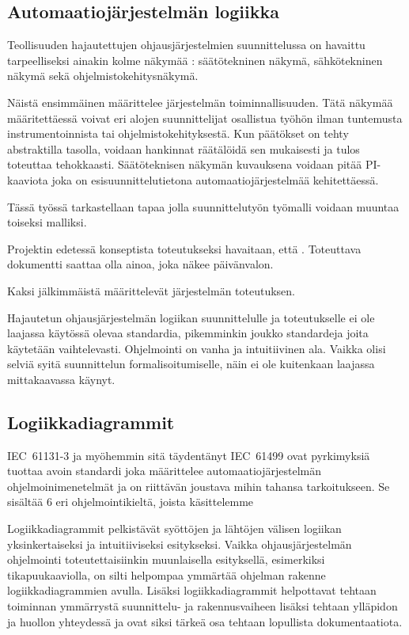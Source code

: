 \documentclass[finnish,12pt]{article}
\begin{document}
	\subsection{Automaatiojärjestelmän logiikka}

Teollisuuden hajautettujen ohjausjärjestelmien suunnittelussa on havaittu tarpeelliseksi ainakin kolme näkymää \cite{RefWorks:38}: säätötekninen näkymä, sähkötekninen näkymä sekä ohjelmistokehitysnäkymä.

Näistä ensimmäinen määrittelee järjestelmän toiminnallisuuden. Tätä näkymää määritettäessä voivat eri alojen suunnittelijat osallistua työhön ilman tuntemusta instrumentoinnista tai ohjelmistokehityksestä. Kun päätökset on tehty abstraktilla tasolla, voidaan hankinnat räätälöidä sen mukaisesti ja tulos toteuttaa tehokkaasti. Säätöteknisen näkymän kuvauksena voidaan pitää PI-kaaviota joka on esisuunnittelutietona automaatiojärjestelmää kehitettäessä.

Tässä työssä tarkastellaan tapaa jolla suunnittelutyön työmalli voidaan muuntaa toiseksi malliksi.

Projektin edetessä konseptista toteutukseksi havaitaan, että . Toteuttava dokumentti saattaa olla ainoa, joka näkee päivänvalon. 

Kaksi jälkimmäistä määrittelevät järjestelmän toteutuksen. 

Hajautetun ohjausjärjestelmän logiikan suunnittelulle ja toteutukselle ei ole laajassa käytössä olevaa standardia, pikemminkin joukko standardeja joita käytetään vaihtelevasti. Ohjelmointi on vanha ja intuitiivinen ala. Vaikka olisi selviä syitä suunnittelun formalisoitumiselle, näin ei ole kuitenkaan laajassa mittakaavassa käynyt.

	\subsection{Logiikkadiagrammit}

IEC~61131-3 ja myöhemmin sitä täydentänyt IEC~61499 ovat pyrkimyksiä tuottaa avoin standardi joka määrittelee automaatiojärjestelmän ohjelmoinimenetelmät ja on riittävän joustava mihin tahansa tarkoitukseen. Se sisältää 6 eri ohjelmointikieltä, joista käsittelemme

Logiikkadiagrammit pelkistävät syöttöjen ja lähtöjen välisen logiikan yksinkertaiseksi ja intuitiiviseksi esitykseksi. Vaikka ohjausjärjestelmän ohjelmointi toteutettaisiinkin muunlaisella esityksellä, esimerkiksi tikapuukaaviolla, on silti helpompaa ymmärtää ohjelman rakenne logiikkadiagrammien avulla. Lisäksi logiikkadiagrammit helpottavat tehtaan toiminnan ymmärrystä suunnittelu- ja rakennusvaiheen lisäksi tehtaan ylläpidon ja huollon yhteydessä ja ovat siksi tärkeä osa tehtaan lopullista dokumentaatiota.
\end{document}
